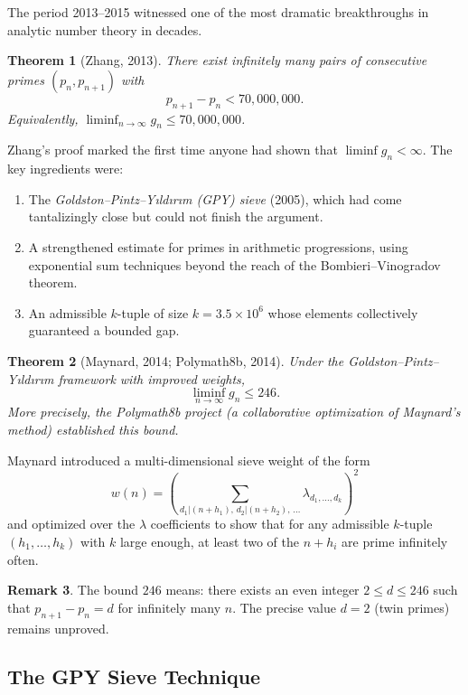 \documentclass[12pt,a4paper]{amsart}
\newtheorem{theorem}{Theorem}[section]
\theoremstyle{definition}
\newtheorem{remark}[theorem]{Remark}
\begin{document}
The period 2013--2015 witnessed one of the most dramatic breakthroughs in
analytic number theory in decades.

\begin{theorem}[Zhang, 2013]
\label{thm:zhang}
There exist infinitely many pairs of consecutive primes $(p_n, p_{n+1})$ with
\[
  p_{n+1} - p_n < 70{,}000{,}000.
\]
Equivalently, $\liminf_{n \to \infty} g_n \leq 70{,}000{,}000$.
\end{theorem}

Zhang's proof marked the first time anyone had shown that $\liminf g_n < \infty$.
The key ingredients were:
\begin{enumerate}[label=(\roman*)]
  \item The \emph{Goldston--Pintz--Y{\i}ld{\i}r{\i}m (GPY) sieve} (2005), which
        had come tantalizingly close but could not finish the argument.
  \item A strengthened estimate for primes in arithmetic progressions, using
        exponential sum techniques beyond the reach of the Bombieri--Vinogradov
        theorem.
  \item An admissible $k$-tuple of size $k = 3.5 \times 10^6$ whose elements
        collectively guaranteed a bounded gap.
\end{enumerate}

\begin{theorem}[Maynard, 2014; Polymath8b, 2014]
\label{thm:maynard}
Under the Goldston--Pintz--Y{\i}ld{\i}r{\i}m framework with improved weights,
\[
  \liminf_{n \to \infty} g_n \leq 246.
\]
More precisely, the Polymath8b project (a collaborative optimization of Maynard's
method) established this bound.
\end{theorem}

Maynard introduced a multi-dimensional sieve weight of the form
\[
  w(n) = \left(\sum_{d_1 | (n+h_1),\, d_2 | (n+h_2),\, \ldots} \lambda_{d_1, \ldots, d_k}\right)^2
\]
and optimized over the $\lambda$ coefficients to show that for any admissible
$k$-tuple $(h_1,\ldots,h_k)$ with $k$ large enough, at least two of the $n+h_i$
are prime infinitely often.

\begin{remark}
The bound $246$ means: there exists an even integer $2 \leq d \leq 246$ such
that $p_{n+1} - p_n = d$ for infinitely many $n$. The precise value $d = 2$
(twin primes) remains unproved.
\end{remark}

\subsection{The GPY Sieve Technique}
\end{document}
